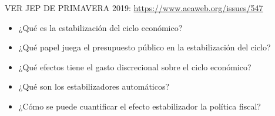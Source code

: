 \documentclass{nuevotema}
\begin{document}
\ideaclave

VER JEP DE PRIMAVERA 2019: \url{https://www.aeaweb.org/issues/547}


\begin{itemize}
	\item ¿Qué es la estabilización del ciclo económico?
	\item ¿Qué papel juega el presupuesto público en la estabilización del ciclo?
	\item ¿Qué efectos tiene el gasto discrecional sobre el ciclo económico?
	\item ¿Qué son los estabilizadores automáticos?
	\item ¿Cómo se puede cuantificar el efecto estabilizador la política fiscal?
\end{itemize}

\esquemacorto
\end{document}
